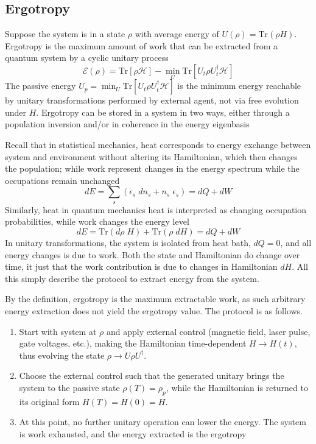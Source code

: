 \documentclass[../../../main.tex]{subfiles}
\begin{document}
\subsection{Ergotropy}
Suppose the system is in a state $\rho$ with average energy of $U(\rho) = \mathrm{Tr}  (\rho H)$.
Ergotropy is the maximum amount of work that can be extracted from a quantum system by a cyclic unitary process
\begin{equation*}
  \mathcal{E}(\rho) = \mathrm{Tr}[\rho \mathcal{H}] - \min_{U} \mathrm{Tr}[U_t \rho U_t^\dagger \mathcal{H}]
\end{equation*}
The passive energy $U_p =  \min_{U} \mathrm{Tr}[U_t \rho U_t^\dagger \mathcal{H}] $ is the minimum energy reachable by unitary transformations performed by external agent, not via free evolution under $H$.
Ergotropy can be stored in a system in two ways, either through a population inversion and/or in coherence in the energy eigenbasis

Recall that in statistical mechanics, heat corresponds to energy exchange between system and environment without altering its Hamiltonian, which then changes the population; while work represent changes in the energy spectrum while the occupations remain unchanged
\begin{equation*}
  dE = \sum_{s } (\epsilon_s\;dn_s+n_s\;\epsilon_s) = dQ+dW
\end{equation*}
Similarly, heat in quantum mechanics heat is interpreted as changing occupation probabilities, while work changes the energy level
\begin{equation*}
  dE = \mathrm{Tr} (d\rho\;H) + \mathrm{Tr} (\rho\;dH)= dQ+dW
\end{equation*}
In unitary transformations, the system is isolated from heat bath, $dQ = 0$, and all energy changes is due to work.
Both the state and Hamiltonian do change over time, it just that the work contribution is due to changes in Hamiltonian $dH$.
All this simply describe the protocol to extract energy from the system.

By the  definition, ergotropy is the maximum extractable work, as such arbitrary energy extraction does not yield the ergotropy value.
The protocol is as follows.
\begin{enumerate}
  \item Start with system at $\rho$ and apply external control (magnetic field, laser pulse, gate voltages, etc.), making the Hamiltonian time-dependent $H \to H(t)$, thus evolving the state $\rho \to U \rho U ^\dagger$.
  \item Choose the external control such that the generated unitary brings the system to the passive state $    \rho(T) = \rho_p$, while the Hamiltonian is returned to its original form $    H(T) = H(0) = H$.
  \item At this point, no further unitary operation can lower the energy. The system is work exhausted, and the energy extracted is the ergotropy
\end{enumerate}
\end{document}

